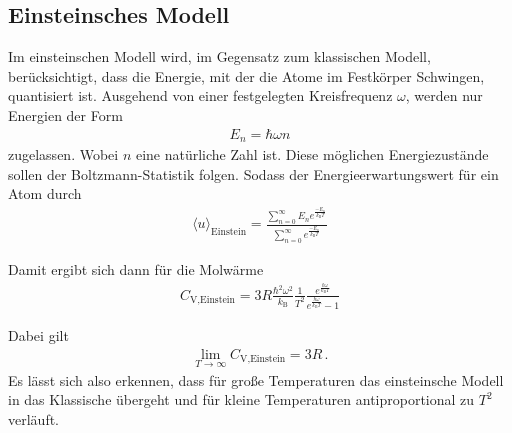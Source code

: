 \subsection{Einsteinsches Modell}
\label{subsec:einstein}
Im einsteinschen Modell wird, im Gegensatz zum klassischen
Modell, berücksichtigt, dass die Energie, mit
der die Atome im Festkörper Schwingen, quantisiert ist.
Ausgehend von einer festgelegten Kreisfrequenz $\omega$,
werden nur Energien der Form
\begin{align*}
	E_{n} = \hbar \omega n
\end{align*}
zugelassen. Wobei $n$ eine natürliche Zahl ist.
Diese möglichen Energiezustände sollen der Boltzmann-Statistik
folgen. Sodass der Energieerwartungswert für ein Atom durch
\begin{align}
	\langle u \rangle_{\text{Einstein}} = \frac{\sum^{\infty}_{n = 0}
	E_{n} e^{\frac{-E_{n}}{k_{\text{B}} T}}}{\sum^{\infty}_{n = 0}
	e^{\frac{-E_{n}}{k_{\text{B}} T}}} \label{eqn:5}
\end{align}

Damit ergibt sich dann für die Molwärme
\begin{align}
	C_{\text{V,Einstein}} = 3 R \frac{\hbar^{2} \omega^{2}}{k_{\text{B}}} \frac{1}{T^{2}}
	\frac{e^{\frac{\hbar \omega}{k_{\text{B}} T}}}{e^{\frac{\hbar \omega}{k_{\text{B}} T}} - 1}\label{eqn:t7}
\end{align}

Dabei gilt
\begin{align}
	\lim_{T \rightarrow \infty} C_{\text{V,Einstein}} = 3R \, . \label{eqn:t8}
\end{align}
Es lässt sich also erkennen, dass  für große Temperaturen
das einsteinsche Modell in das Klassische übergeht und für kleine Temperaturen
antiproportional zu $T^2$ verläuft.

